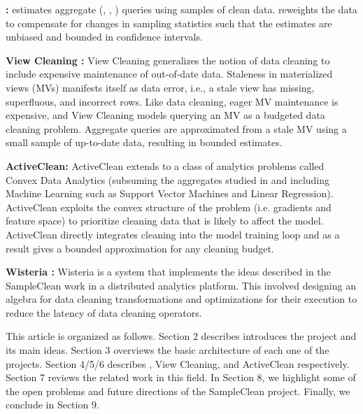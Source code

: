 \vspace{0.5em}
\noindent \textbf{\sampleclean \cite{wang1999sample}: } \sampleclean estimates aggregate (\sumfunc, \countfunc, \avgfunc) queries using samples of clean data. \sampleclean reweights the data to compensate for changes in sampling statistics such that the estimates are unbiased and bounded in confidence intervals.

\vspace{0.5em}
\noindent \textbf{View Cleaning \cite{krishnan2015svc}: } View Cleaning generalizes the notion of data cleaning to include expensive maintenance of out-of-date data. Staleness in materialized views (MVs) manifests itself as data error, i.e., a stale view has missing, superfluous, and incorrect rows.
Like data cleaning, eager MV maintenance is expensive, and View Cleaning models querying an MV as a budgeted data cleaning problem.
Aggregate queries are approximated from a stale MV using a small sample of up-to-date data, resulting in bounded estimates.

\vspace{0.5em}
\noindent \textbf{ActiveClean: } ActiveClean extends \sampleclean to a class of analytics problems called Convex Data Analytics (subsuming the aggregates studied in \sampleclean and including Machine Learning such as Support Vector Machines and Linear Regression). ActiveClean exploits the convex structure of the problem (i.e. gradients and feature space) to prioritize cleaning data that is likely to affect the model. ActiveClean directly integrates cleaning into the model training loop and as a result gives a bounded approximation for any cleaning budget.

\vspace{0.5em}
\noindent \textbf{Wisteria \cite{haas2015wisteria}: } Wisteria is a system that implements the ideas described in the SampleClean work in a distributed analytics platform. This involved designing an algebra for data cleaning transformations and optimizations for their execution to reduce the latency of data cleaning operators.

\vspace{0.5em}

This article is organized as follows. Section 2 describes introduces the project and its main ideas. Section 3 overviews the basic architecture of each one of the projects. Section 4/5/6 describes \sampleclean, View Cleaning, and ActiveClean respectively. Section 7 reviews the related work in this field. In Section 8, we highlight some of the open problems and future directions of the SampleClean project. Finally, we conclude in Section 9.